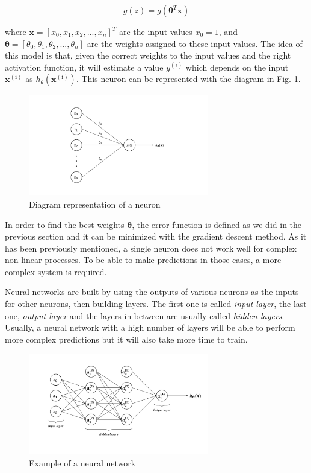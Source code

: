 \documentclass[a4paper, report, oneside, UKenglish]{memoir}
\newcommand{\x}{\boldsymbol{x}}
\newcommand{\btheta}{\boldsymbol{\theta}}
\begin{document}
\begin{equation}
    g(z) = g(\btheta^T\boldsymbol{x})
\end{equation}

where $\x = [x_0, x_1, x_2, ..., x_n]^T$ are the input values $x_0 = 1$, and $\btheta = [\theta_0, \theta_1, \theta_2, ..., \theta_n]$ are the weights assigned to these input values. The idea of this model is that, given the correct weights to the input values and the right activation function, it will estimate a value $y^{(i)}$ which depends on the input $\boldsymbol{x^{(i)}}$ as $h_\theta(\boldsymbol{x^{(i)}})$. This neuron can be represented with the diagram in Fig. \ref{fig:neuron_diag}. 

\begin{figure}[ht]
    \centering
    \includegraphics[width=0.7\textwidth]{figures/fitting/neuron_diagram.png}
    \caption{Diagram representation of a neuron}
    \label{fig:neuron_diag}
\end{figure}

In order to find the best weights $\btheta$, the error function is defined as we did in the previous section and it can be minimized with the gradient descent method. As it has been previously mentioned, a single neuron does not work well for complex non-linear processes. To be able to make predictions in those cases, a more complex system is required. 

Neural networks are built by using the outputs of various neurons as the inputs for other neurons, then building layers. The first one is called \textit{input layer}, the last one, \textit{output layer} and the layers in between are usually called \textit{hidden layers}. Usually, a neural network with a high number of layers will be able to perform more complex predictions but it will also take more time to train.

\begin{figure}[ht]
    \centering
    \includegraphics[width=0.7\textwidth]{figures/fitting/neural_network_example.png}
    \caption{Example of a neural network}
    \label{fig:neural_network_example}
\end{figure}
\end{document}

